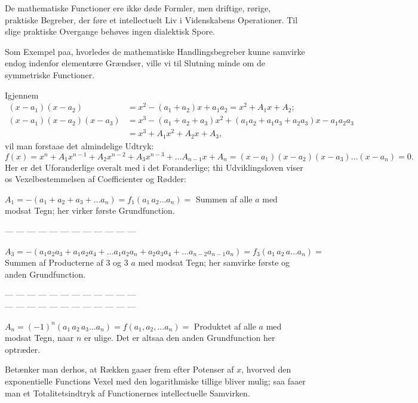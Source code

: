 \documentclass[12pt]{book}
\newcommand{\opage}[1]{\marginnote{\footnotesize\textit{[#1]}}}
\begin{document}
De mathematiske Functioner ere ikke døde Formler, men driftige, rørige,
praktiske Begreber, der føre et intellectuelt Liv i Videnskabens Operationer. Til
slige praktiske Overgange behøves ingen dialektisk Spore.

Som Exempel paa, hvorledes de mathematiske Handlingsbegreber kunne samvirke endog
indenfor elementære Grændser, ville vi til Slutning minde om de symmetriske
Functioner.

Igjennem
\[
\begin{aligned}
(x-a_1)(x-a_2) &= x^{2} - (a_1+a_2)x + a_1a_2 = x^{2} + A_1 x + A_2;\\
(x-a_1)(x-a_2)(x-a_3) &= x^{3} - (a_1+a_2+a_3)x^{2}
   + (a_1a_2 + a_1a_3 + a_2a_3)x - a_1a_2a_3\\
&= x^{3} + A_1 x^{2} + A_2 x + A_3,
\end{aligned}
\]
vil man forstaae det almindelige Udtryk:
\[
f(x) = x^{n} + A_1 x^{n-1} + A_2 x^{n-2} + A_3 x^{n-3} + \dots A_{n-1}x + A_n
   = (x-a_1)(x-a_2)(x-a_3)\dots(x-a_n) = 0.
\]
Her er det Uforanderlige overalt med i det Foranderlige; thi Udviklingsloven
viser os Vexelbestemmelsen af Coefficienter og Rødder:

$A_1 = -(a_1+a_2+a_3+\dots a_n) = f_1(a_1\,a_2\dots a_n) = $ Summen af alle $a$
med modsat Tegn; her virker første Grundfunction.

\begin{center}--- --- --- --- --- --- --- --- --- --- --- ---\end{center}


$A_3 = -(a_1a_2a_3 + a_1a_2a_4 + \dots a_1a_2a_n + a_2a_3a_4 + \dots
a_{n-2}a_{n-1}a_n) = f_3(a_1\,a_2\,a\dots a_n) = $ Summen af Producterne af 3 og 3
$a$ med modsat Tegn; her samvirke første og anden Grundfunction.

\begin{center}--- --- --- --- --- --- --- --- --- --- --- ---\\
--- --- --- --- --- --- --- --- --- --- --- ---\end{center}

\opage{19} $A_n = (-1)^{n}(a_1\,a_2\,a_3\dots a_n) = f(a_1, a_2, \dots a_n) = $ Produktet af
alle $a$ med modsat Tegn, naar $n$ er ulige. Det er altsaa den anden
Grundfunction her optræder.

Betænker man derhos, at Rækken gaaer frem efter Potenser af $x$, hvorved den
exponentielle Functions Vexel med den logarithmiske tillige bliver mulig; saa
faaer man et Totalitetsindtryk af Functionernes intellectuelle Samvirken.
\end{document}
